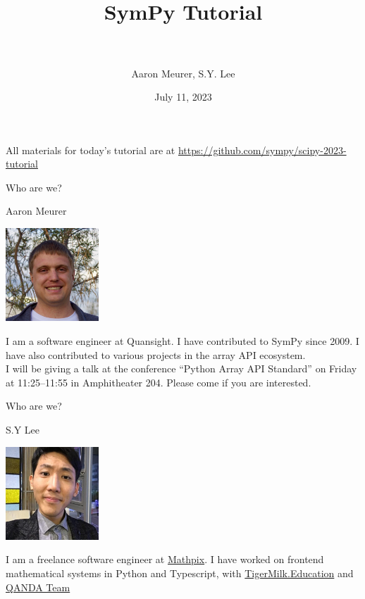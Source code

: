 \documentclass[xcolor=svgnames]{beamer}
\title[SymPy\hspace{4em}\insertframenumber/
\inserttotalframenumber]{~\\ SymPy Tutorial \\~}
\author[A. Meurer, S.Y. Lee]
{Aaron Meurer, S.Y. Lee}
\institute{\pgfuseimage{mylogo}}
\date{July 11, 2023}
\begin{document}
\begin{frame}
  \maketitle
\begin{center}
\normalsize All materials for today's tutorial are at \url{https://github.com/sympy/scipy-2023-tutorial}
\end{center}
\end{frame}

\begin{frame}{Who are we?}
  \begin{block}{Aaron Meurer}
    \begin{center}
      \includegraphics[height=3.5cm]{aaron.png}
    \end{center}
    I am a software engineer at Quansight. I have contributed to SymPy since
    2009. I have also contributed to various projects in the array API
    ecosystem.
    \\
    I will be giving a talk at the conference ``Python Array API Standard'' on
    Friday at 11:25–11:55 in Amphitheater 204. Please come if you are
    interested.
  \end{block}
\end{frame}

\begin{frame}{Who are we?}
  \begin{block}{S.Y Lee}
    \begin{center}
      \includegraphics[height=3.5cm]{sylee.jpeg}
    \end{center}
    I am a freelance software engineer at \href{https://mathpix.com/}{Mathpix}.
    I have worked on frontend mathematical systems in Python and Typescript,
    with \href{https://www.tigermilk.education/}{TigerMilk.Education} and \href{https://mathpresso.com/}{QANDA Team}
  \end{block}
\end{frame}
\end{document}
